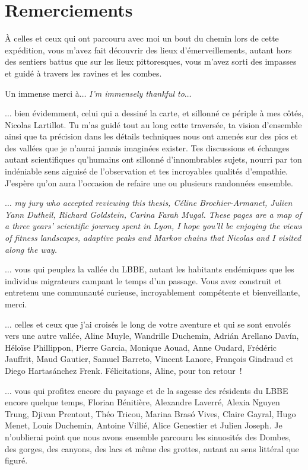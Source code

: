 \thispagestyle{empty}
\section*{Remerciements}

À celles et ceux qui ont parcouru avec moi un bout du chemin lors de cette expédition, vous m’avez fait découvrir des lieux d’émerveillements, autant hors des sentiers battus que sur les lieux pittoresques, vous m’avez sorti des impasses et guidé à travers les ravines et les combes.

Un immense merci à$\hdots$ \textit{I’m immensely thankful to$\hdots$}

$\hdots$ bien évidemment, celui qui a dessiné la carte, et sillonné ce périple à mes côtés, Nicolas Lartillot.
Tu m’as guidé tout au long cette traversée, ta vision d’ensemble ainsi que ta précision dans les détails techniques nous ont amenés sur des pics et des vallées que je n’aurai jamais imaginées exister.
Tes discussions et échanges autant scientifiques qu’humains ont sillonné d'innombrables sujets, nourri par ton indéniable sens aiguisé de l’observation et tes incroyables qualités d’empathie.
J’espère qu’on aura l’occasion de refaire une ou plusieurs randonnées ensemble.

$\hdots$ \textit{my jury who accepted reviewing this thesis, Céline Brochier-Armanet, Julien Yann Dutheil, Richard Goldstein, Carina Farah Mugal.
These pages are a map of a three years’ scientific journey spent in Lyon, I hope you’ll be enjoying the views of fitness landscapes, adaptive peaks and Markov chains that Nicolas and I visited along the way.}

$\hdots$ vous qui peuplez la vallée du LBBE, autant les habitants endémiques que les individus migrateurs campant le temps d’un passage.
Vous avez construit et entretenu une communauté curieuse, incroyablement compétente et bienveillante, merci.

$\hdots$ celles et ceux que j’ai croisés le long de votre aventure et qui se sont envolés vers une autre vallée, Aline Muyle, Wandrille Duchemin, Adrián Arellano Davín, Héloïse Phillippon, Pierre Garcia, Monique Aouad, Anne Oudard, Frédéric Jauffrit, Maud Gautier, Samuel Barreto, Vincent Lanore, François Gindraud et Diego Hartasánchez Frenk.
Félicitations, Aline, pour ton retour~!

$\hdots$ vous qui profitez encore du paysage et de la sagesse des résidents du LBBE encore quelque temps, Florian Bénitière, Alexandre Laverré, Alexia Nguyen Trung, Djivan Prentout, Théo Tricou, Marina Brasó Vives, Claire Gayral, Hugo Menet, Louis Duchemin, Antoine Villié, Alice Genestier et Julien Joseph.
Je n’oublierai point que nous avons ensemble parcouru les sinuosités des Dombes, des gorges, des canyons, des lacs et même des grottes, autant au sens littéral que figuré.

